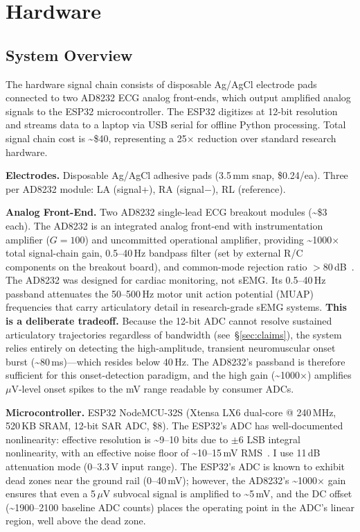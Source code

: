 \documentclass[11pt, a4paper]{article}
\begin{document}
\section{Hardware}
\label{sec:hardware}

\subsection{System Overview}

The hardware signal chain consists of disposable Ag/AgCl electrode pads connected to two AD8232 ECG analog front-ends, which output amplified analog signals to the ESP32 microcontroller. The ESP32 digitizes at 12-bit resolution and streams data to a laptop via USB serial for offline Python processing. Total signal chain cost is \textasciitilde\$40, representing a 25$\times$ reduction over standard research hardware.

\textbf{Electrodes.} Disposable Ag/AgCl adhesive pads (3.5\,mm snap, \$0.24/ea). Three per AD8232 module: LA (signal+), RA (signal$-$), RL (reference).

\textbf{Analog Front-End.} Two AD8232 single-lead ECG breakout modules (\textasciitilde\$3 each). The AD8232 is an integrated analog front-end with instrumentation amplifier ($G=100$) and uncommitted operational amplifier, providing \textasciitilde1000$\times$ total signal-chain gain, 0.5--40\,Hz bandpass filter (set by external R/C components on the breakout board), and common-mode rejection ratio $>$80\,dB~\cite{ad8232}. The AD8232 was designed for cardiac monitoring, not sEMG. Its 0.5--40\,Hz passband attenuates the 50--500\,Hz motor unit action potential (MUAP) frequencies that carry articulatory detail in research-grade sEMG systems. \textbf{This is a deliberate tradeoff.} Because the 12-bit ADC cannot resolve sustained articulatory trajectories regardless of bandwidth (see~\S\ref{sec:claims}), the system relies entirely on detecting the high-amplitude, transient neuromuscular onset burst (\textasciitilde80\,ms)---which resides below 40\,Hz. The AD8232's passband is therefore sufficient for this onset-detection paradigm, and the high gain (\textasciitilde1000$\times$) amplifies $\mu$V-level onset spikes to the mV range readable by consumer ADCs.

\textbf{Microcontroller.} ESP32 NodeMCU-32S (Xtensa LX6 dual-core @ 240\,MHz, 520\,KB SRAM, 12-bit SAR ADC, \$8). The ESP32's ADC has well-documented nonlinearity: effective resolution is \textasciitilde9--10 bits due to $\pm$6 LSB integral nonlinearity, with an effective noise floor of \textasciitilde10--15\,mV RMS~\cite{esp32adc}. I use 11\,dB attenuation mode (0--3.3\,V input range). The ESP32's ADC is known to exhibit dead zones near the ground rail (0--40\,mV); however, the AD8232's \textasciitilde1000$\times$ gain ensures that even a 5\,$\mu$V subvocal signal is amplified to \textasciitilde5\,mV, and the DC offset (\textasciitilde1900--2100 baseline ADC counts) places the operating point in the ADC's linear region, well above the dead zone.
\end{document}
